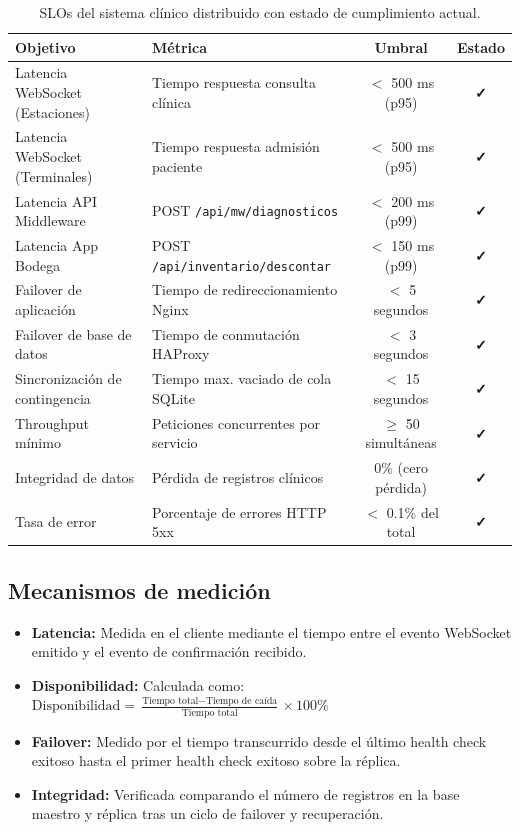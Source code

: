 \documentclass[11pt,a4paper]{article}
\newcommand{\ok}{\textcolor{okgreen}{\textbf{✓}}}
\begin{document}
\begin{table}[h!]
\centering
\begin{tabularx}{\textwidth}{Xlcc}
\toprule
\textbf{Objetivo} & \textbf{Métrica} & \textbf{Umbral} & \textbf{Estado} \\
\midrule
Latencia WebSocket (Estaciones) &
    Tiempo respuesta consulta clínica & $<$ 500 ms (p95) & \ok \\
Latencia WebSocket (Terminales) &
    Tiempo respuesta admisión paciente & $<$ 500 ms (p95) & \ok \\
Latencia API Middleware &
    POST \texttt{/api/mw/diagnosticos} & $<$ 200 ms (p99) & \ok \\
Latencia App Bodega &
    POST \texttt{/api/inventario/descontar} & $<$ 150 ms (p99) & \ok \\
Failover de aplicación &
    Tiempo de redireccionamiento Nginx & $<$ 5 segundos & \ok \\
Failover de base de datos &
    Tiempo de conmutación HAProxy & $<$ 3 segundos & \ok \\
Sincronización de contingencia &
    Tiempo max. vaciado de cola SQLite & $<$ 15 segundos & \ok \\
Throughput mínimo &
    Peticiones concurrentes por servicio & $\geq$ 50 simultáneas & \ok \\
Integridad de datos &
    Pérdida de registros clínicos & 0\% (cero pérdida) & \ok \\
Tasa de error &
    Porcentaje de errores HTTP 5xx & $<$ 0.1\% del total & \ok \\
\bottomrule
\end{tabularx}
\caption{SLOs del sistema clínico distribuido con estado de cumplimiento actual.}
\end{table}

\subsection{Mecanismos de medición}

\begin{itemize}
    \item \textbf{Latencia:} Medida en el cliente mediante el tiempo entre el evento
          WebSocket emitido y el evento de confirmación recibido.
    \item \textbf{Disponibilidad:} Calculada como:
          $\text{Disponibilidad} = \frac{\text{Tiempo total} - \text{Tiempo de caída}}{\text{Tiempo total}} \times 100\%$
    \item \textbf{Failover:} Medido por el tiempo transcurrido desde el último
          health check exitoso hasta el primer health check exitoso sobre la réplica.
    \item \textbf{Integridad:} Verificada comparando el número de registros en la
          base maestro y réplica tras un ciclo de failover y recuperación.
\end{itemize}
\end{document}
